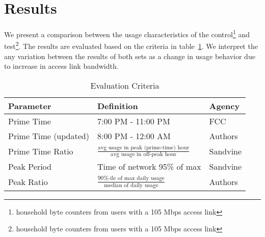 \section{Results}
\label{sec:results}


We present a comparison between the usage characteristics of the control\footnote{household byte counters from users with a 105 Mbps access link} and test\footnote{household byte counters from users with a 105 Mbps access link}. The results are evaluated based on the criteria in table~\ref{tab:eval-criteria}. We interpret the any variation between the results of both sets as a change in usage behavior due to increase in access link bandwidth.

\begin{table}[ht!]
\begin{tabular}{|l|l|l|}
\hline
\textbf{Parameter}        & \textbf{Definition}                                                                     & \textbf{Agency}  \\ \hline
Prime Time       & 7:00 PM - 11:00 PM                                                             & FCC       \\
Prime Time (updated)       & 8:00 PM - 12:00 AM                                                             & Authors       \\

Prime Time Ratio & \( \frac{ \text{avg usage in peak (prime-time) hour}}{ \text{avg usage in off-peak hour}}\) & Sandvine  \\
Peak Period      & Time of network 95\% of max                                              & Sandvine \\
Peak Ratio       & \(\frac{\text{90\%-ile of max daily usage}}{\text{median of daily usage}}\)                & Authors \\\hline
\end{tabular}
\caption{Evaluation Criteria}
\label{tab:eval-criteria}
\end{table}






%